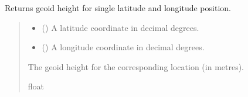 \documentclass[letterpaper,10pt,english]{sphinxmanual}
\begin{document}
\begin{fulllineitems}
\label{\detokenize{modules/earth/geoid:qnav.earth.geoid.GeoidDummy}}
\pysigstartsignatures
{}
\pysigstopsignatures{}

\begin{fulllineitems}
\label{\detokenize{modules/earth/geoid:qnav.earth.geoid.GeoidDummy.get_height}}
\pysigstartsignatures
{}
\pysigstopsignatures
\sphinxAtStartPar
Returns geoid height for single latitude and longitude position.
\begin{quote}\begin{description}
\begin{itemize}
\item {} 
\sphinxAtStartPar
{} () \textendash{} A latitude coordinate in decimal degrees.

\item {} 
\sphinxAtStartPar
{} () \textendash{} A longitude coordinate in decimal degrees.

\end{itemize}

\sphinxAtStartPar
The geoid height for the corresponding location (in metres).

\sphinxAtStartPar
float

\end{description}\end{quote}

\end{fulllineitems}



\end{fulllineitems}
\end{document}
